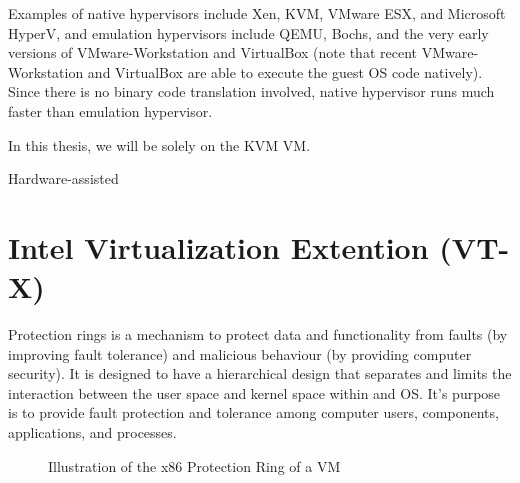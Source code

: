 \documentclass{report}
\begin{document}
\begin{spacing}{1.5}
{\large
Examples of native hypervisors include Xen, KVM, VMware ESX, and Microsoft HyperV, and emulation hypervisors include QEMU, Bochs, and the very early versions of
VMware-Workstation and VirtualBox (note that recent VMware-Workstation and VirtualBox are able to execute the guest OS code natively). Since there is no binary code
translation involved, native hypervisor runs much faster than emulation hypervisor.

In this thesis, we will be solely on the KVM VM.








Hardware-assisted




}













\section{Intel Virtualization Extention (VT-X)}

{\large
Protection rings is a mechanism to protect data and functionality from faults (by improving fault tolerance) and malicious behaviour (by providing computer security). It is designed to have a hierarchical design that separates and limits the interaction between the user space and kernel space within and OS. It's purpose is to provide fault protection and tolerance among computer users, components, applications, and processes.
\newline
}

{\large
{}
\begin{figure}[!h]
\caption{Illustration of the x86 Protection Ring of a VM}
\begin{center}
\end{center}
\end{figure}}
\end{spacing}
\end{document}
